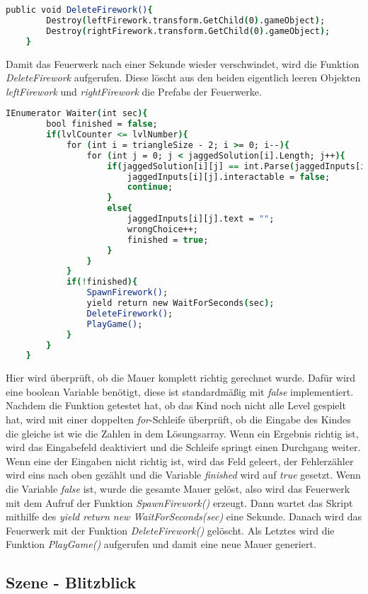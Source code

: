 \begin{lstlisting}[language=csh, caption={Triangle.cs DeleteFirework-Funktion}]
	public void DeleteFirework(){
		Destroy(leftFirework.transform.GetChild(0).gameObject);
		Destroy(rightFirework.transform.GetChild(0).gameObject);
	}
\end{lstlisting}
Damit das Feuerwerk nach einer Sekunde wieder verschwindet, wird die Funktion \textit{DeleteFirework} aufgerufen. Diese löscht aus den beiden eigentlich leeren Objekten \textit{leftFirework} und \textit{rightFirework} die Prefabs der Feuerwerke.\\
\begin{lstlisting}[language=csh, caption={Triangle.cs Waiter-Coroutine}]
	IEnumerator Waiter(int sec){
		bool finished = false;
		if(lvlCounter <= lvlNumber){
			for (int i = triangleSize - 2; i >= 0; i--){
				for (int j = 0; j < jaggedSolution[i].Length; j++){
					if(jaggedSolution[i][j] == int.Parse(jaggedInputs[i][j].text)){
						jaggedInputs[i][j].interactable = false;
						continue;
					}
					else{
						jaggedInputs[i][j].text = "";
						wrongChoice++;
						finished = true;
					}
				}
			}
			if(!finished){
				SpawnFirework();
				yield return new WaitForSeconds(sec);
				DeleteFirework();
				PlayGame();
			}
		}
	}
\end{lstlisting}
Hier wird überprüft, ob die Mauer komplett richtig gerechnet wurde. Dafür wird eine boolean Variable benötigt, diese ist standardmäßig mit \textit{false} implementiert. Nachdem die Funktion getestet hat, ob das Kind noch nicht alle Level gespielt hat, wird mit einer doppelten \textit{for}-Schleife überprüft, ob die Eingabe des Kindes die gleiche ist wie die Zahlen in dem Lösungsarray. Wenn ein Ergebnis richtig ist, wird das Eingabefeld deaktiviert und die Schleife springt einen Durchgang weiter. Wenn eine der Eingaben nicht richtig ist, wird das Feld geleert, der Fehlerzähler wird eins nach oben gezählt und die Variable \textit{finished} wird auf \textit{true} gesetzt. Wenn die Variable \textit{false} ist, wurde die gesamte Mauer gelöst, also wird das Feuerwerk mit dem Aufruf der Funktion \textit{SpawnFirework()} erzeugt. Dann wartet das Skript mithilfe des \textit{yield return new WaitForSeconds(sec)} eine Sekunde. Danach wird das Feuerwerk mit der Funktion \textit{DeleteFirework()} gelöscht. Als Letztes wird die Funktion \textit{PlayGame()} aufgerufen und damit eine neue Mauer generiert.
\newpage
\subsection{Szene - Blitzblick}
